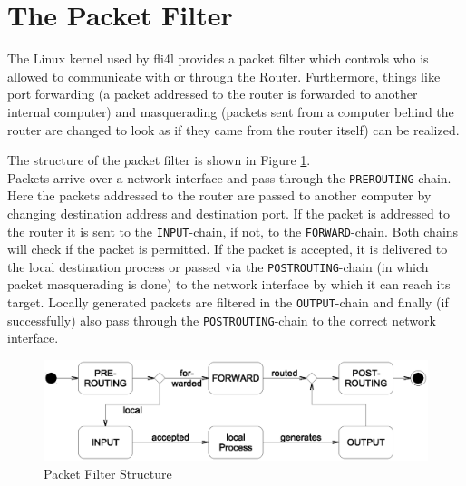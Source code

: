 \section{The Packet Filter}

\newcommand{\fwaction}[1]{{\small\textsf{#1}}}
\newcommand{\fwchain}[1]{\texttt{#1}}
\newcommand{\fwtable}[1]{\textsc{#1}}
\newcommand{\fwmatch}[1]{\texttt{#1}}
\newcommand{\fwpktstate}[1]{\texttt{#1}}
\newcommand{\fwloglevel}[1]{\texttt{#1}}
\newcommand{\protocol}[1]{\texttt{#1}}
\newcommand{\host}[1]{\texttt{#1}}
\newcommand{\package}[1]{\texttt{#1}}

The Linux kernel used by fli4l provides a packet filter which controls
who is allowed to communicate with or through the Router. Furthermore,
things like port forwarding (a packet addressed to the router is
forwarded to another internal computer) and masquerading (packets
sent from a computer behind the router are changed to look as
if they came from the router itself) can be realized.

The structure of the packet filter is shown in Figure \ref{fig:netfilter}.\\

Packets arrive over a network interface and pass through the \fwchain{PREROUTING}-chain.
Here the packets addressed to the router are passed to another computer by
changing destination address and destination port. If the packet is
addressed to the router it is sent to the \fwchain{INPUT}-chain, if not, to the
\fwchain{FORWARD}-chain. Both chains will check if the packet is permitted.
If the packet is accepted, it is delivered to the local destination process
or passed via the \fwchain{POSTROUTING}-chain (in which packet masquerading is done)
to the network interface by which it can reach its target. Locally generated
packets are filtered in the \fwchain{OUTPUT}-chain and finally (if
successfully) also pass through the \fwchain{POSTROUTING}-chain to the
correct network interface.

\begin{figure}[htbp]
  \centering
  \includegraphics[width=\columnwidth]{firewall}
  \caption{Packet Filter Structure}
  \label{fig:netfilter}
\end{figure}

